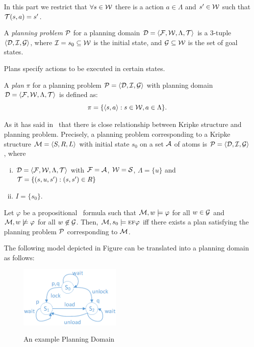 \documentclass[letterpaper]{article} %
\begin{document}
In this part we restrict that $\forall s \in \cal W$ there is a action $a \in \Lambda$ and $s'\in \cal W$ such that ${\cal T}(s, a) = s'$.

A \emph{planning problem} $\cal P$ for a planning domain ${\cal D} ={\langle{{\cal F}, {\cal W}, \Lambda, \cal T}\rangle}$ is a 3-tuple ${\langle{\cal D, \cal I, \cal G}\rangle}$, where ${\cal I} = {s_0} \subseteq \cal W$ is the initial state, and $\cal G \subseteq W$ is the set of goal states. 

Plans specify actions to be executed in certain states. 
\begin{definition}[Plan]\label{pro:plan}
 A \emph{plan} $\pi$ for a planning problem $\cal P = {\langle{\cal D, \cal I, \cal G}\rangle}$ with planning domain ${\cal D} ={\langle{{\cal F}, {\cal W}, \Lambda, \cal T}\rangle}$ is defined as:
 \[
    \pi=\{{\langle{s,a}\rangle}:s \in {\cal W}, a\in \Lambda\}.
 \]
 \end{definition}
 
 As it has said in~\cite{giunchiglia1999planning} that there is close relationship between Kripke structure and planning problem. 
 Precisely, a planning problem corresponding to a Kripke structure
 ${\cal M} = {\langle{S, R, L}\rangle}$ with initial state $s_0$ on a set $\cal A$ of atoms is $\cal P = {\langle{\cal D, \cal I, \cal G}\rangle}$, where
 \begin{enumerate}[(i)]
   \item ${\cal D} ={\langle{{\cal F}, {\cal W}, \Lambda, \cal T}\rangle}$ with $\cal F = \cal A$, $\cal W = \cal S$, $\Lambda =\{u\}$ and ${\cal T} = \{(s, u, s') : (s, s') \in R\}$
   \item $I = \{s_0\}$.
 \end{enumerate}
    
    Let $\varphi$ be a propositional \CTL\ formula such that ${\cal M}, w \models \varphi$ for all $w \in \cal G$ and ${\cal M}, w \not \models \varphi$ for all $w \not \in \cal G$. Then, ${\cal M}, s_0 \models \textsc{e} \textsc{f} \varphi$ iff there exists a plan satisfying the planning problem $\cal P$ corresponding to ${\cal M}$.
 
 
 \begin{example}
 The following model depicted in Figure can be translated into a planning domain as follows:

 
 \begin{figure}[ht]
  \centering
  \includegraphics[width=5cm]{PlanningDomain.png}\\
  \caption{An example Planning Domain}\label{PD}
\end{figure}


 \end{example}
 
\end{document}
